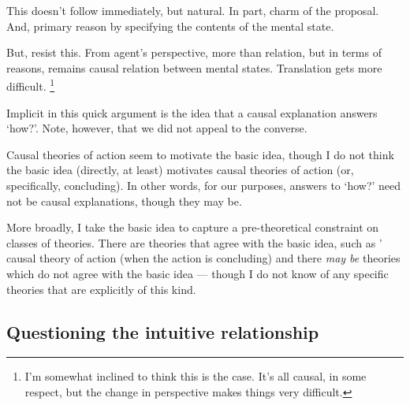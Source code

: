 \begin{note}
  This doesn't follow immediately, but natural.
  In part, charm of the proposal.
  And, primary reason by specifying the contents of the mental state.

  But, resist this.
  From agent's perspective, more than relation, but in terms of reasons, remains causal relation between mental states.
  Translation gets more difficult.%
  \footnote{
    I'm somewhat inclined to think this is the case.
    It's all causal, in some respect, but the change in perspective makes things very difficult.
  }

  Implicit in this quick argument is the idea that a causal explanation answers `how?'.
  Note, however, that we did not appeal to the converse.

  Causal theories of action seem to motivate the basic idea, though I do not think the basic idea (directly, at least) motivates causal theories of action (or, specifically, concluding).
  In other words, for our purposes, answers to `how?' need not be causal explanations, though they may be.

  More broadly, I take the basic idea to capture a pre-theoretical constraint on classes of theories.
  There are theories that agree with the basic idea, such as \citeauthor{Davidson:1963aa}' causal theory of action (when the action is concluding) and there \emph{may be} theories which do not agree with the basic idea --- though I do not know of any specific theories that are explicitly of this kind.
\end{note}

\subsection{Questioning the intuitive relationship}

